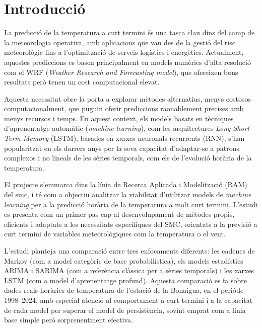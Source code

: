 \documentclass[../main.tex]{subfiles}
\begin{document}

\chapter{Introducció} \label{ch:intro}

La predicció de la temperatura a curt termini és una tasca clau dins del camp de la meteorologia operativa, amb aplicacions que van des de la gestió del risc meteorològic fins a l’optimització de serveis logístics i energètics. Actualment, aquestes prediccions es basen principalment en models numèrics d’alta resolució com el WRF (\textit{Weather Research and Forecasting model}), que ofereixen bons resultats però tenen un cost computacional elevat.

Aquesta necessitat obre la porta a explorar mètodes alternatius, menys costosos computacionalment, que puguin oferir prediccions raonablement precises amb menys recursos i temps. En aquest context, els models basats en tècniques d’aprenentatge automàtic (\textit{machine learning}), com les arquitectures  \textit{Long Short-Term Memory} (LSTM), basades en xarxes neuronals recurrents (RNN), s'han popularitzat en els darrers anys per la  seva capacitat d’adaptar-se a patrons complexos i no lineals de les sèries temporals, com els de l'evolució horària de la temperatura.

El projecte s’emmarca dins la línia de Recerca Aplicada i Modelització (RAM) del \gls{smc}, i té com a objectiu analitzar la viabilitat d’utilitzar models de \textit{machine learning} per a la predicció horària de la temperatura a molt curt termini. L’estudi es presenta com un primer pas cap al desenvolupament de mètodes propis, eficients i adaptats a les necessitats específiques del SMC, orientats a la previsió a curt termini de variables meteorològiques com la temperatura o el vent.

L'estudi planteja una comparació entre tres enfocaments diferents: les cadenes de Markov (com a model categòric de base probabilística), els models estadístics ARIMA i SARIMA (com a referència clàssica per a sèries temporals) i les xarxes LSTM (com a model d’aprenentatge profund). Aquesta comparació es fa sobre dades reals horàries de temperatura de l’estació de la Bonaigua, en el perióde 1998–2024, amb especial atenció al comportament a curt termini i a la capacitat de cada model per superar el model de persistència, sovint emprat com a línia base simple però sorprenentment efectiva.
\end{document}
